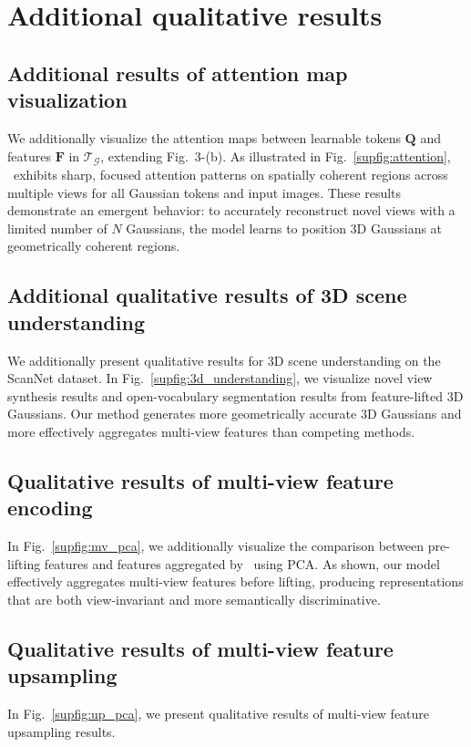 \section{Additional qualitative results}
\label{sec:additional_qual}
\subsection{Additional results of attention map visualization}

We additionally visualize the attention maps between learnable tokens $\mathbf{Q}$ and features $\mathbf{F}$ in $\mathcal{T}_\mathcal{G}$, extending Fig.~\textcolor[HTML]{367DBD}{3}-(b). As illustrated in Fig.~\ref{supfig:attention}, \ours\ exhibits sharp, focused attention patterns on spatially coherent regions across multiple views for all Gaussian tokens and input images. These results demonstrate an emergent behavior: to accurately reconstruct novel views with a limited number of $N$ Gaussians, the model learns to position 3D Gaussians at geometrically coherent regions.

\subsection{Additional qualitative results of 3D scene understanding}

We additionally present qualitative results for 3D scene understanding on the ScanNet dataset. In Fig.~\ref{supfig:3d_understanding}, we visualize novel view synthesis results and open-vocabulary segmentation results from feature-lifted 3D Gaussians. Our method generates more geometrically accurate 3D Gaussians and more effectively aggregates multi-view features than competing methods.

\subsection{Qualitative results of multi-view feature encoding}

In Fig.~\ref{supfig:mv_pca}, we additionally visualize the comparison between pre-lifting features and features aggregated by \oursF\ using PCA. As shown, our model effectively aggregates multi-view features before lifting, producing representations that are both view-invariant and more semantically discriminative.

\subsection{Qualitative results of multi-view feature upsampling}

In Fig.~\ref{supfig:up_pca}, we present qualitative results of multi-view feature upsampling results. 

